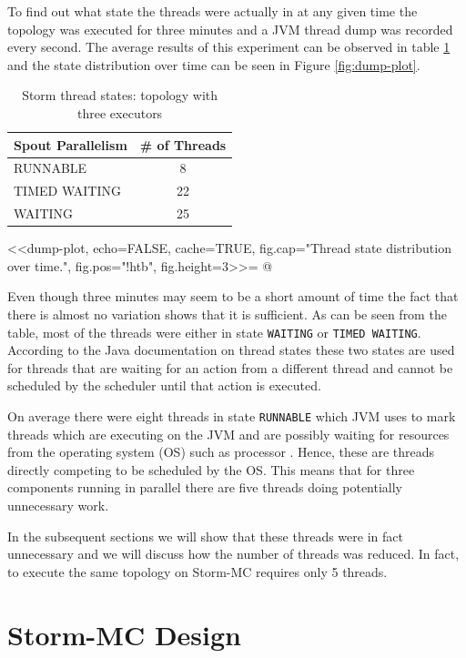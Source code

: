 To find out what state the threads were actually in at any given time the topology was executed for three minutes and a JVM thread dump was recorded every second. The average results of this experiment can be observed in table \ref{table:dump} and the state distribution over time can be seen in Figure \ref{fig:dump-plot}.

\begin{table}[htb!]
\centering
\small
\begin{tabular}{@{}lc@{}}
    \textbf{Spout Parallelism} & \textbf{\# of Threads} \\ \toprule
    RUNNABLE & 8  \\
	TIMED WAITING & 22  \\
    WAITING & 25  \\
\end{tabular}
\caption[Storm thread states]{Storm thread states: topology with three executors}
\label{table:dump}
\end{table}

<<dump-plot, echo=FALSE, cache=TRUE, fig.cap="Thread state distribution over time.", fig.pos="!htb", fig.height=3>>=
@

Even though three minutes may seem to be a short amount of time the fact that there is almost no variation shows that it is sufficient. As can be seen from the table, most of the threads were either in state \texttt{WAITING} or \texttt{TIMED WAITING}. According to the Java documentation on thread states \citep{JavaThreads} these two states are used for threads that are waiting for an action from a different thread and cannot be scheduled by the scheduler until that action is executed.

On average there were eight threads in state \texttt{RUNNABLE} which JVM uses to mark threads which are executing on the JVM and are possibly waiting for resources from the operating system (OS) such as processor \citep{JavaThreads}. Hence, these are threads directly competing to be scheduled by the OS. This means that for three components running in parallel there are five threads doing potentially unnecessary work.

In the subsequent sections we will show that these threads were in fact unnecessary and we will discuss how the number of threads was reduced. In fact, to execute the same topology on Storm-MC requires only 5 threads.

\section{Storm-MC Design}
\label{sec:storm_mc_arch}

